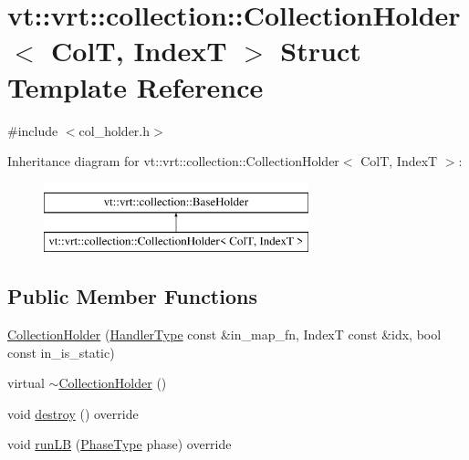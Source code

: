 \hypertarget{structvt_1_1vrt_1_1collection_1_1_collection_holder}{}\section{vt\+:\+:vrt\+:\+:collection\+:\+:Collection\+Holder$<$ ColT, IndexT $>$ Struct Template Reference}
\label{structvt_1_1vrt_1_1collection_1_1_collection_holder}


{\ttfamily \#include $<$col\+\_\+holder.\+h$>$}

Inheritance diagram for vt\+:\+:vrt\+:\+:collection\+:\+:Collection\+Holder$<$ ColT, IndexT $>$\+:\begin{figure}[H]
\begin{center}
\leavevmode
\includegraphics[height=2.000000cm]{structvt_1_1vrt_1_1collection_1_1_collection_holder}
\end{center}
\end{figure}
\subsection*{Public Member Functions}
\begin{DoxyCompactItemize}
\item 
\hyperlink{structvt_1_1vrt_1_1collection_1_1_collection_holder_a75bb95393ac580b3f330da43e295a47a}{Collection\+Holder} (\hyperlink{namespacevt_af64846b57dfcaf104da3ef6967917573}{Handler\+Type} const \&in\+\_\+map\+\_\+fn, IndexT const \&idx, bool const in\+\_\+is\+\_\+static)
\item 
virtual \hyperlink{structvt_1_1vrt_1_1collection_1_1_collection_holder_a80360d38dc40e4bf2253288b01595de6}{$\sim$\+Collection\+Holder} ()
\item 
void \hyperlink{structvt_1_1vrt_1_1collection_1_1_collection_holder_a744d2a48f9f22db59b2705b3d3f3d1ca}{destroy} () override
\item 
void \hyperlink{structvt_1_1vrt_1_1collection_1_1_collection_holder_a09a3f3e6ec221f36f3417713e64e8f69}{run\+LB} (\hyperlink{namespacevt_a46ce6733d5cdbd735d561b7b4029f6d7}{Phase\+Type} phase) override
\end{DoxyCompactItemize}
